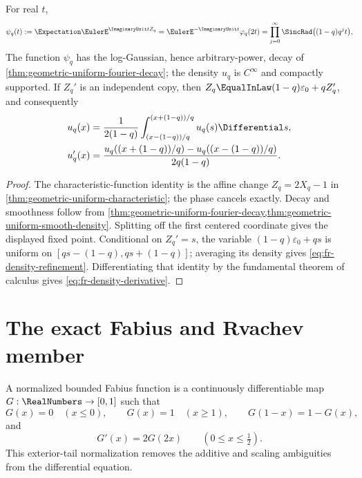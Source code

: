 \begin{corollary}
\label{thm:fr-geometric-density}
For real \(t\),
\begin{equation}
 \psi_q(t):=\Expectation\EulerE^{\ImaginaryUnit tZ_q}
 =\EulerE^{-\ImaginaryUnit t}\varphi_q(2t)
 =\prod_{j=0}^{\infty}\SincRad\bigl((1-q)q^jt\bigr),
 \label{eq:fr-sinc-product}
\end{equation}
The function \(\psi_q\) has the log-Gaussian, hence arbitrary-power, decay of
\cref{thm:geometric-uniform-fourier-decay}; the density \(u_q\) is
\(C^\infty\) and compactly supported.  If \(Z_q'\) is an independent copy,
then \(Z_q\EqualInLaw(1-q)\varepsilon_0+qZ_q'\), and consequently
\begin{align}
 u_q(x)
 &=\frac1{2(1-q)}
   \int_{(x-(1-q))/q}^{(x+(1-q))/q}u_q(s)\Differential s,
 \label{eq:fr-density-refinement}\\
 u_q'(x)
 &=\frac{u_q((x+(1-q))/q)-u_q((x-(1-q))/q)}
 {2q(1-q)}.\label{eq:fr-density-derivative}
\end{align}
\end{corollary}

\begin{proof}
The characteristic-function identity is the affine change
\(Z_q=2X_q-1\) in \cref{thm:geometric-uniform-characteristic}; the phase
cancels exactly.  Decay and smoothness follow from
\cref{thm:geometric-uniform-fourier-decay,thm:geometric-uniform-smooth-density}.
Splitting off the first centered
coordinate gives the displayed fixed point.  Conditional on \(Z_q'=s\), the
variable \((1-q)\varepsilon_0+qs\) is uniform on
\([qs-(1-q),qs+(1-q)]\); averaging its density gives
\cref{eq:fr-density-refinement}.  Differentiating that identity by the
fundamental theorem of calculus gives \cref{eq:fr-density-derivative}.
\end{proof}

\section{The exact Fabius and Rvachev member}
\label{sec:fr-fabius-member}

\begin{definition}
\label{def:fr-normalized-fabius}
A normalized bounded Fabius function is a continuously differentiable map
\(G:\RealNumbers\to[0,1]\) such that
\[
 G(x)=0\quad(x\le0),\qquad G(x)=1\quad(x\ge1),
 \qquad G(1-x)=1-G(x),
\]
and
\[
 G'(x)=2G(2x)\qquad(0\le x\le\tfrac12).
\]
This exterior-tail normalization removes the additive and scaling ambiguities
from the differential equation.
\end{definition}

